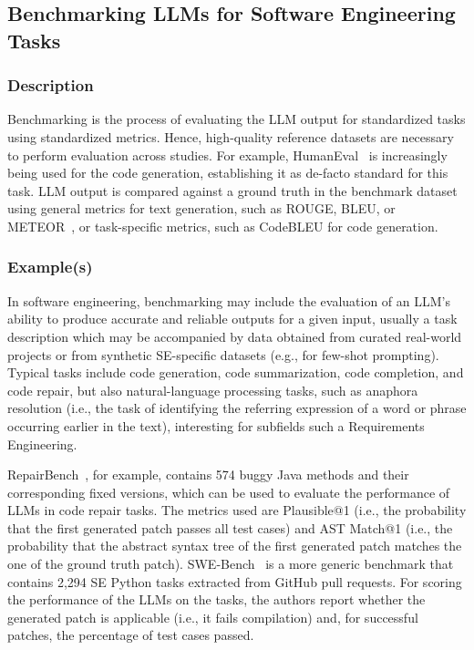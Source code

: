 \subsection{Benchmarking LLMs for Software Engineering Tasks}
\label{sec:sec:benchmarking-llms-for-software-engineering-tasks}

\subsubsection{Description}

Benchmarking is the process of evaluating the LLM output for standardized tasks using standardized metrics.
Hence, high-quality reference datasets are necessary to perform evaluation across studies.
For example, HumanEval~\cite{DBLP:journals/corr/abs-2107-03374} is increasingly being used for the code generation, establishing it as de-facto standard for this task.   
LLM output is compared against a ground truth in the benchmark dataset using general metrics for text generation, such as ROUGE, BLEU, or METEOR~\cite{10.1145/3695988}, or task-specific metrics, such as CodeBLEU for code generation.

\subsubsection{Example(s)}

In software engineering, benchmarking may include the evaluation of an LLM's ability to produce accurate and reliable outputs for a given input, usually a task description which may be accompanied by data obtained from curated real-world projects or from synthetic SE-specific datasets (e.g., for few-shot prompting).
Typical tasks include code generation, code summarization, code completion, and code repair, but also natural-language processing tasks, such as anaphora resolution (i.e., the task of identifying the referring expression of a word or phrase occurring earlier in the text), interesting for subfields such a Requirements Engineering. 

RepairBench~\cite{silva2024repairbench}, for example, contains 574 buggy Java methods and their corresponding fixed versions, which can be used to evaluate the performance of LLMs in code repair tasks.
The metrics used are Plausible@1 (i.e., the probability that the first generated patch passes all test cases) and AST Match@1 (i.e., the probability that the abstract syntax tree of the first generated patch matches the one of the ground truth patch).
SWE-Bench~\cite{DBLP:conf/iclr/JimenezYWYPPN24} is a more generic benchmark that contains 2,294 SE Python tasks extracted from GitHub pull requests.
For scoring the performance of the LLMs on the tasks, the authors report whether the generated patch is applicable (i.e., it fails compilation) and, for successful patches, the percentage of test cases passed.

